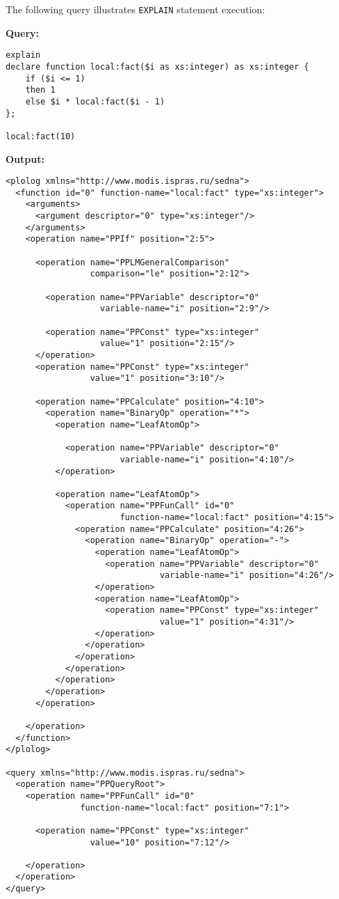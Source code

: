 \documentclass[a4paper,12pt]{article}
\begin{document}
\medskip
\noindent
The following query illustrates \verb!EXPLAIN! statement execution:

\medskip
\noindent
\textbf{Query:}
\begin{verbatim}
explain
declare function local:fact($i as xs:integer) as xs:integer {
    if ($i <= 1)
    then 1
    else $i * local:fact($i - 1)
};

local:fact(10)
\end{verbatim}
\textbf{Output:}

\small{
\begin{verbatim}
<plolog xmlns="http://www.modis.ispras.ru/sedna">
  <function id="0" function-name="local:fact" type="xs:integer">
    <arguments>
      <argument descriptor="0" type="xs:integer"/>
    </arguments>
    <operation name="PPIf" position="2:5">

      <operation name="PPLMGeneralComparison" 
                 comparison="le" position="2:12">

        <operation name="PPVariable" descriptor="0" 
                   variable-name="i" position="2:9"/>

        <operation name="PPConst" type="xs:integer" 
                   value="1" position="2:15"/>
      </operation>
      <operation name="PPConst" type="xs:integer" 
                 value="1" position="3:10"/>

      <operation name="PPCalculate" position="4:10">
        <operation name="BinaryOp" operation="*">
          <operation name="LeafAtomOp">

            <operation name="PPVariable" descriptor="0" 
                       variable-name="i" position="4:10"/>
          </operation>

          <operation name="LeafAtomOp">
            <operation name="PPFunCall" id="0" 
                       function-name="local:fact" position="4:15">
              <operation name="PPCalculate" position="4:26">
                <operation name="BinaryOp" operation="-">
                  <operation name="LeafAtomOp">
                    <operation name="PPVariable" descriptor="0" 
                               variable-name="i" position="4:26"/>
                  </operation>
                  <operation name="LeafAtomOp">
                    <operation name="PPConst" type="xs:integer" 
                               value="1" position="4:31"/>
                  </operation>
                </operation>
              </operation>
            </operation>
          </operation>
        </operation>
      </operation>
    
    </operation>
  </function>
</plolog>

<query xmlns="http://www.modis.ispras.ru/sedna">
  <operation name="PPQueryRoot">
    <operation name="PPFunCall" id="0" 
               function-name="local:fact" position="7:1">

      <operation name="PPConst" type="xs:integer" 
                 value="10" position="7:12"/>

    </operation>
  </operation>
</query>
\end{verbatim}}
\end{document}
